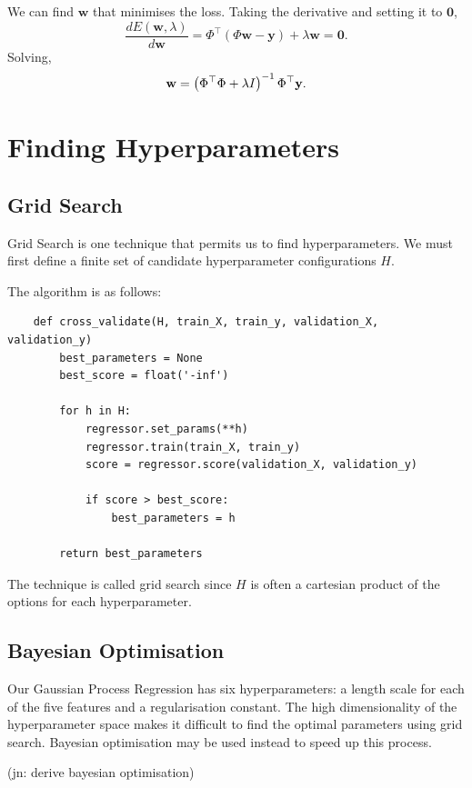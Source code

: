 \documentclass[11pt,twoside,openright]{report}
\newcommand\bw{\mathbf{w}}
\newcommand\by{\mathbf{y}}
\newcommand\jn[1]{{\color{red}(jn: #1)}}
\begin{document}
We can find $\bw$ that minimises the loss. Taking the derivative and setting it to $\mathbf{0}$,\[
    \frac{dE(\bw, \lambda)}{d\bw} = \Phi^\top(\Phi\bw - \by) + \lambda \bw = \mathbf{0} \text{.}
\] Solving,\[
    \bw = \left(\Phi^\top\Phi + \lambda I\right)^{-1}\Phi^\top\by \text.
\]

\section{Finding Hyperparameters}

  \subsection{Grid Search}

  Grid Search is one technique that permits us to find hyperparameters. We must first define a finite set of candidate hyperparameter configurations $H$.

  The algorithm is as follows:
  \begin{verbatim}
    def cross_validate(H, train_X, train_y, validation_X, validation_y)
        best_parameters = None
        best_score = float('-inf')

        for h in H:
            regressor.set_params(**h)
            regressor.train(train_X, train_y)
            score = regressor.score(validation_X, validation_y)

            if score > best_score:
                best_parameters = h

        return best_parameters
  \end{verbatim}

  The technique is called grid search since $H$ is often a cartesian product of the options for each hyperparameter.

  \subsection{Bayesian Optimisation}
  Our Gaussian Process Regression has six hyperparameters: a length scale for each of the five features and a regularisation constant. The high dimensionality of the hyperparameter space makes it difficult to find the optimal parameters using grid search. Bayesian optimisation may be used instead to speed up this process.

\jn{derive bayesian optimisation}
\end{document}
